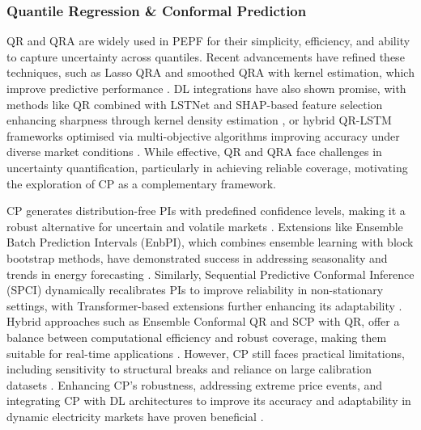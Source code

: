 \subsubsection*{Quantile Regression \& Conformal Prediction}
QR and QRA are widely used in PEPF for their simplicity, efficiency, and ability to capture uncertainty across quantiles. Recent advancements have refined these techniques, such as Lasso QRA and smoothed QRA with kernel estimation, which improve predictive performance \cite{uniejewski2021regularized, uniejewski2023smoothing}. DL integrations have also shown promise, with methods like QR combined with LSTNet and SHAP-based feature selection enhancing sharpness through kernel density estimation \cite{liu2023day}, or hybrid QR-LSTM frameworks optimised via multi-objective algorithms improving accuracy under diverse market conditions \cite{xu2024novel}. While effective, QR and QRA face challenges in uncertainty quantification, particularly in achieving reliable coverage, motivating the exploration of CP as a complementary framework.

CP generates distribution-free PIs with predefined confidence levels, making it a robust alternative for uncertain and volatile markets \cite{gammerman1998learning, vovk2005algorithmic}. Extensions like Ensemble Batch Prediction Intervals (EnbPI), which combines ensemble learning with block bootstrap methods, have demonstrated success in addressing seasonality and trends in energy forecasting \cite{xu2021conformal, zaffran2022adaptive}. Similarly, Sequential Predictive Conformal Inference (SPCI) dynamically recalibrates PIs to improve reliability in non-stationary settings, with Transformer-based extensions further enhancing its adaptability \cite{lee2024transformer}. Hybrid approaches such as Ensemble Conformal QR and SCP with QR, offer a balance between computational efficiency and robust coverage, making them suitable for real-time applications \cite{jensen2022ensemble, cordier2023flexible}.  However, CP still faces practical limitations, including sensitivity to structural breaks and reliance on large calibration datasets \cite{foygel2022conformal}. Enhancing CP’s robustness, addressing extreme price events, and integrating CP with DL architectures to improve its accuracy and adaptability in dynamic electricity markets have proven beneficial \cite{angelopoulos2024conformal, xu2024conformal}.